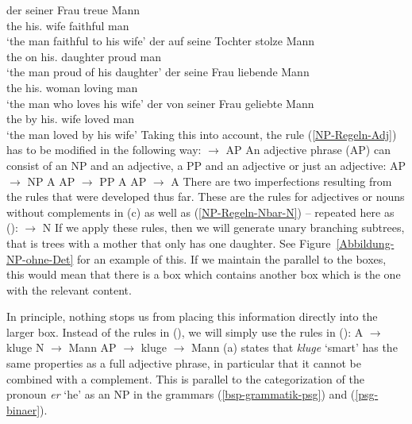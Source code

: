 \eal
\ex 
\gll der seiner Frau treue Mann\\
	 the his.\dat{} wife faithful man\\
\glt `the man faithful to his wife'
\ex 
\gll der auf seine Tochter stolze Mann\\
	 the on his.\acc{} daughter proud man\\
\glt `the man proud of his daughter'
\ex 
\gll der seine Frau liebende Mann\\
	 the his.\acc{} woman loving man\\
\glt `the man who loves his wife'
\ex 
\gll der von seiner Frau geliebte Mann\\
     the by his.\dat{} wife loved man\\
\glt `the man loved by his wife'	 
\zl
Taking this into account, the rule (\ref{NP-Regeln-Adj}) has to be modified in the following way:
\ea
\label{NP-Regeln-AP} 
\nbar $\to$ AP \nbar
\z
An adjective phrase (AP) can consist of an NP and an adjective, a PP and an adjective or just an adjective:
\eal
\ex AP $\to$ NP A
\ex AP $\to$ PP A
\ex AP $\to$ A
\zl
\addlines
There are two imperfections resulting from the rules that were developed thus far. These are the rules for adjectives
or nouns without complements in (c) as well as (\ref{NP-Regeln-Nbar-N}) -- repeated here as ():
\ea
\nbar $\to$ N
\z
If we apply these rules, then we will generate unary branching subtrees, that is trees with a mother that
only has one daughter. See Figure~\ref{Abbildung-NP-ohne-Det} for an example of this. If we maintain the
parallel to the boxes, this would mean that there is a box which contains another box which is the one with 
the relevant content.

In principle, nothing stops us from placing this information directly into the larger box. Instead of
the rules in (), we will simply use the rules in ():
\eal
\ex A $\to$ kluge
\ex N $\to$ Mann
\zl
\eal
\label{Lexikon-Projektion}
\ex AP $\to$ kluge
\ex \nbar $\to$ Mann
\zl
(a) states that \emph{kluge}  `smart' has the same properties as a full adjective phrase, in particular that it cannot be combined
with a complement. This is parallel to the categorization of the pronoun \emph{er} `he' as an NP in the grammars
(\ref{bsp-grammatik-psg}) and (\ref{psg-binaer}).

